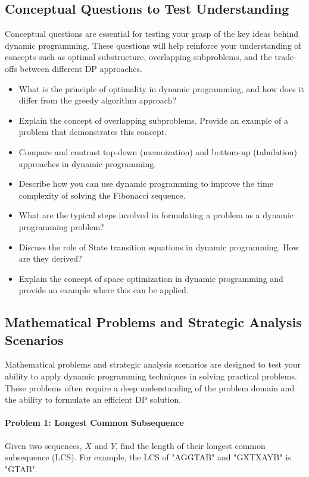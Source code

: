 \documentclass[12pt]{book} %
\begin{document}
\subsection{Conceptual Questions to Test Understanding}
Conceptual questions are essential for testing your grasp of the key ideas behind dynamic programming. These questions will help reinforce your understanding of concepts such as optimal substructure, overlapping subproblems, and the trade-offs between different DP approaches.

\begin{itemize}
    \item What is the principle of optimality in dynamic programming, and how does it differ from the greedy algorithm approach?
    \item Explain the concept of overlapping subproblems. Provide an example of a problem that demonstrates this concept.
    \item Compare and contrast top-down (memoization) and bottom-up (tabulation) approaches in dynamic programming.
    \item Describe how you can use dynamic programming to improve the time complexity of solving the Fibonacci sequence.
    \item What are the typical steps involved in formulating a problem as a dynamic programming problem?
    \item Discuss the role of State transition equations in dynamic programming. How are they derived?
    \item Explain the concept of space optimization in dynamic programming and provide an example where this can be applied.
\end{itemize}

\subsection{Mathematical Problems and Strategic Analysis Scenarios}
Mathematical problems and strategic analysis scenarios are designed to test your ability to apply dynamic programming techniques in solving practical problems. These problems often require a deep understanding of the problem domain and the ability to formulate an efficient DP solution.

\paragraph{Problem 1: Longest Common Subsequence}
Given two sequences, $X$ and $Y$, find the length of their longest common subsequence (LCS). For example, the LCS of "AGGTAB" and "GXTXAYB" is "GTAB".
\end{document}
